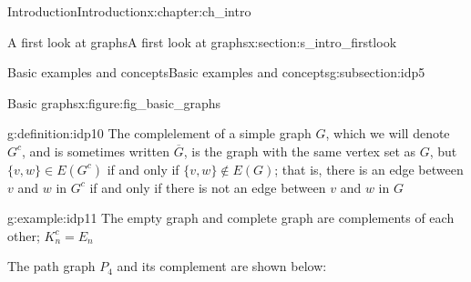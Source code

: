 \documentclass[oneside,10pt,]{book}
\numberwithin{equation}{section}
\begin{document}
\begin{chapterptx}{Introduction}{}{Introduction}{}{}{x:chapter:ch_intro}
\begin{sectionptx}{A first look at graphs}{}{A first look at graphs}{}{}{x:section:s_intro_firstlook}
\begin{subsectionptx}{Basic examples and concepts}{}{Basic examples and concepts}{}{}{g:subsection:idp5}
\begin{figureptx}{Basic graphs}{x:figure:fig_basic_graphs}{}
\begin{image}{0.05}{0.9}{0.05}
{
}%
\end{image}%
\tcblower
\end{figureptx}%
\begin{definition}{}{g:definition:idp10}%
The complelement of a simple graph \(G\), which we will denote \(G^c\), and is sometimes written \(\overline{G}\), is the graph with the same vertex set as \(G\), but \(\{v,w\}\in E(G^c)\) if and only if \(\{v,w\}\notin E(G)\); that is, there is an edge between \(v\) and \(w\) in \(G^c\) if and only if there is not an edge between \(v\) and \(w\) in \(G\)%
\end{definition}
\begin{example}{}{g:example:idp11}%
The empty graph and complete graph are complements of each other; \(K_n^c=E_n\)%
\par
The path graph \(P_4\) and its complement are shown below:%
\begin{image}{0.05}{0.9}{0.05}%
\end{image}
\end{example}
\end{subsectionptx}
\end{sectionptx}
\end{chapterptx}
\end{document}
